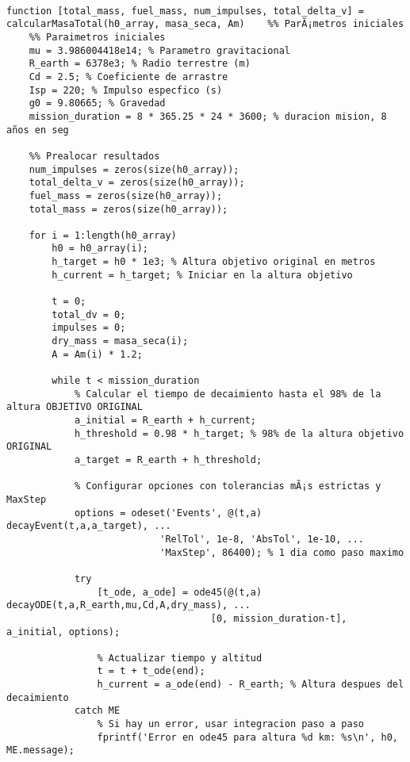 \begin{verbatim}

function [total_mass, fuel_mass, num_impulses, total_delta_v] = calcularMasaTotal(h0_array, masa_seca, Am)    %% ParÃ¡metros iniciales
    %% Paraimetros iniciales
    mu = 3.986004418e14; % Parametro gravitacional
    R_earth = 6378e3; % Radio terrestre (m)
    Cd = 2.5; % Coeficiente de arrastre
    Isp = 220; % Impulso espec­fico (s)
    g0 = 9.80665; % Gravedad 
    mission_duration = 8 * 365.25 * 24 * 3600; % duracion mision, 8 años en seg
    
    %% Prealocar resultados
    num_impulses = zeros(size(h0_array));
    total_delta_v = zeros(size(h0_array));
    fuel_mass = zeros(size(h0_array));
    total_mass = zeros(size(h0_array));
    
    for i = 1:length(h0_array)
        h0 = h0_array(i);
        h_target = h0 * 1e3; % Altura objetivo original en metros
        h_current = h_target; % Iniciar en la altura objetivo
        
        t = 0;
        total_dv = 0;
        impulses = 0;
        dry_mass = masa_seca(i);
        A = Am(i) * 1.2;
        
        while t < mission_duration
            % Calcular el tiempo de decaimiento hasta el 98% de la altura OBJETIVO ORIGINAL
            a_initial = R_earth + h_current;
            h_threshold = 0.98 * h_target; % 98% de la altura objetivo ORIGINAL
            a_target = R_earth + h_threshold;
            
            % Configurar opciones con tolerancias mÃ¡s estrictas y MaxStep
            options = odeset('Events', @(t,a) decayEvent(t,a,a_target), ...
                           'RelTol', 1e-8, 'AbsTol', 1e-10, ...
                           'MaxStep', 86400); % 1 dia como paso maximo
            
            try
                [t_ode, a_ode] = ode45(@(t,a) decayODE(t,a,R_earth,mu,Cd,A,dry_mass), ...
                                    [0, mission_duration-t], a_initial, options);
                
                % Actualizar tiempo y altitud
                t = t + t_ode(end);
                h_current = a_ode(end) - R_earth; % Altura despues del decaimiento
            catch ME
                % Si hay un error, usar integracion paso a paso
                fprintf('Error en ode45 para altura %d km: %s\n', h0, ME.message);
                

\end{verbatim}

